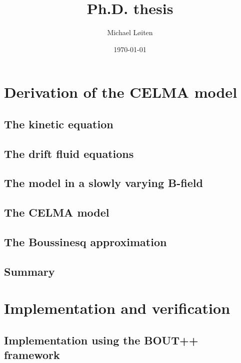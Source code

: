 \documentclass[12pt,a4paper,oneside,openright]{report} %
\title{\vspace{-8ex}Ph.D. thesis\vspace{-1ex}}
\author{Michael L{\o}iten}
\date{\vspace{-2ex}\today}
\begin{document}
\maketitle
%
\part{Derivation of the CELMA model}
\chapter{The kinetic equation}

%
\chapter{The drift fluid equations}
\label{chap:drift-order}


\chapter{The model in a slowly varying B-field}


\chapter{The CELMA model}
\label{chap:CELMA}






\chapter{The Boussinesq approximation}

\chapter{Summary}


\part{Implementation and verification}
\chapter{Implementation using the BOUT++ framework}
\label{chap:implBOUT++}




\end{document}
